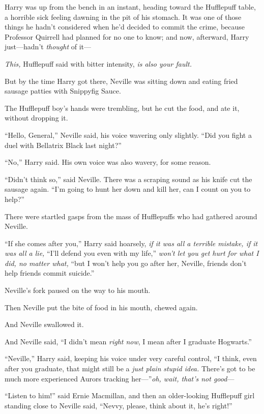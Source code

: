 Harry was up from the bench in an instant, heading toward the Hufflepuff
table, a horrible sick feeling dawning in the pit of his stomach. It was
one of those things he hadn't considered when he'd decided to commit the
crime, because Professor Quirrell had planned for no one to know; and
now, afterward, Harry just---hadn't \emph{thought} of it---

\emph{This,} Hufflepuff said with bitter intensity, \emph{is also your
fault.}

But by the time Harry got there, Neville was sitting down and eating
fried sausage patties with Snippyfig Sauce.

The Hufflepuff boy's hands were trembling, but he cut the food, and ate
it, without dropping it.

``Hello, General,'' Neville said, his voice wavering only slightly.
``Did you fight a duel with Bellatrix Black last night?''

``No,'' Harry said. His own voice was also wavery, for some reason.

``Didn't think so,'' said Neville. There was a scraping sound as his
knife cut the sausage again. ``I'm going to hunt her down and kill her,
can I count on you to help?''

There were startled gasps from the mass of Hufflepuffs who had gathered
around Neville.

``If she comes after you,'' Harry said hoarsely, \emph{if it was all a
terrible mistake, if it was all a lie,} ``I'll defend you even with my
life,'' \emph{won't let you get hurt for what I did, no matter what,}
``but I won't help you go after her, Neville, friends don't help friends
commit suicide.''

Neville's fork paused on the way to his mouth.

Then Neville put the bite of food in his mouth, chewed again.

And Neville swallowed it.

And Neville said, ``I didn't mean \emph{right now}, I mean after I
graduate Hogwarts.''

``Neville,'' Harry said, keeping his voice under very careful control,
``I think, even after you graduate, that might still be a \emph{just
plain} \emph{stupid idea.} There's got to be much more experienced
Aurors tracking her---''\emph{oh, wait, that's not good}---

``Listen to him!'' said Ernie Macmillan, and then an older-looking
Hufflepuff girl standing close to Neville said, ``Nevvy, please, think
about it, he's right!''

